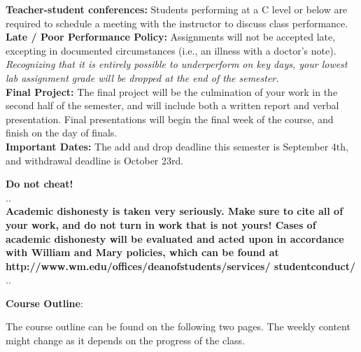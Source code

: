 \documentclass[11pt]{article}
\begin{document}
\textbf {\large Teacher-student conferences:} Students performing at a C level or below are required to schedule a meeting with the instructor to discuss class performance.\\

\textbf {\large Late / Poor Performance Policy:} Assignments will not be accepted late, excepting in documented circumstances (i.e., an illness with a doctor's note).  \textit{Recognizing that it is entirely possible to underperform on key days, your lowest lab assignment grade will be dropped at the end of the semester.}\\

\textbf {\large Final Project:} The final project will be the culmination of your work in the second half of the semester, and will include both a written report and verbal presentation.  Final presentations will begin the final week of the course, and finish on the day of finals. \\

\textbf {\large Important Dates:} The add and drop deadline this semester is September 4th, and withdrawal deadline is October 23rd.

\vspace{4mm}
\textbf {\LARGE Do not cheat!} \\
.\hrulefill . \\
\textbf{Academic dishonesty is taken very seriously.  Make sure to cite all of your work, and do not turn in work that is not yours!  Cases of academic dishonesty will be evaluated and acted upon in accordance with William and Mary policies, which can be found at http://www.wm.edu/offices/deanofstudents/services/
studentconduct/} \\
.\hrulefill . \\
\vspace{8mm}

\textbf {\large Course Outline}:

The course outline can be found on the following two pages.  The weekly content might change as it depends on the progress of the class.
\end{document}
